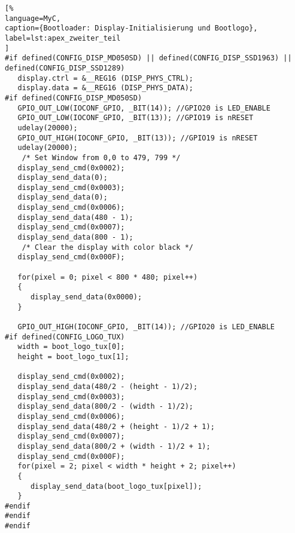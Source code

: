 \begin{lstlisting}[%
language=MyC,
caption={Bootloader: Display-Initialisierung und Bootlogo},
label=lst:apex_zweiter_teil
]
#if defined(CONFIG_DISP_MD050SD) || defined(CONFIG_DISP_SSD1963) || defined(CONFIG_DISP_SSD1289)
   display.ctrl = &__REG16 (DISP_PHYS_CTRL);   
   display.data = &__REG16 (DISP_PHYS_DATA); 
#if defined(CONFIG_DISP_MD050SD)
   GPIO_OUT_LOW(IOCONF_GPIO, _BIT(14)); //GPIO20 is LED_ENABLE
   GPIO_OUT_LOW(IOCONF_GPIO, _BIT(13)); //GPIO19 is nRESET
   udelay(20000);
   GPIO_OUT_HIGH(IOCONF_GPIO, _BIT(13)); //GPIO19 is nRESET
   udelay(20000);
	/* Set Window from 0,0 to 479, 799 */
   display_send_cmd(0x0002);			
   display_send_data(0);				
   display_send_cmd(0x0003);			
   display_send_data(0);				
   display_send_cmd(0x0006);
   display_send_data(480 - 1);
   display_send_cmd(0x0007);
   display_send_data(800 - 1);
	/* Clear the display with color black */
   display_send_cmd(0x000F);

   for(pixel = 0; pixel < 800 * 480; pixel++)
   {
      display_send_data(0x0000);
   }

   GPIO_OUT_HIGH(IOCONF_GPIO, _BIT(14)); //GPIO20 is LED_ENABLE
#if defined(CONFIG_LOGO_TUX)
   width = boot_logo_tux[0];
   height = boot_logo_tux[1];

   display_send_cmd(0x0002);
   display_send_data(480/2 - (height - 1)/2);
   display_send_cmd(0x0003);
   display_send_data(800/2 - (width - 1)/2);
   display_send_cmd(0x0006);
   display_send_data(480/2 + (height - 1)/2 + 1);
   display_send_cmd(0x0007);
   display_send_data(800/2 + (width - 1)/2 + 1);
   display_send_cmd(0x000F);
   for(pixel = 2; pixel < width * height + 2; pixel++)
   {
      display_send_data(boot_logo_tux[pixel]);
   }
#endif
#endif
#endif
\end{lstlisting}

